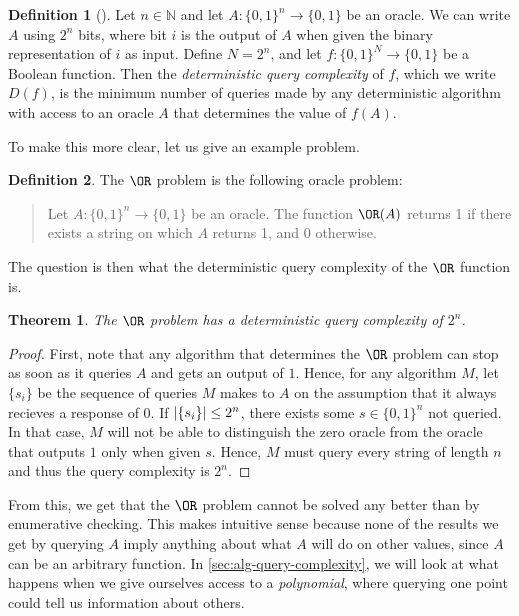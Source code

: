 \documentclass[english,12pt]{reedthesis}
\theoremstyle{plain}
\newtheorem{thm}{Theorem}[section]
\theoremstyle{definition}
\newtheorem{defn}[defn]{Definition}
\theoremstyle{remark}
\DeclarePairedDelimiter{\abs}{\lvert}{\rvert}
\begin{document}
\begin{defn}[{\cite[17]{AW09}}]\label{def:det-qc}
  Let $n \in \mathbb{N}$ and let $A\colon \{0, 1\}^{n} \rightarrow \{0, 1\}$ be an oracle. We can write
  $A$ using $2^{n}$ bits, where bit $i$ is the output of $A$ when given the
  binary representation of $i$ as input. Define $N = 2^{n}$, and let
  $f\colon \{0, 1\}^{N} \rightarrow \{0, 1\}$ be a Boolean function. Then the
  \emph{deterministic query complexity} of $f$, which we write $D(f)$, is the
  minimum number of queries made by any deterministic algorithm with access to
  an oracle $A$ that determines the value of $f(A)$.
\end{defn}

To make this more clear, let us give an example problem.

\begin{defn}\label{def:or-problem}
  The $\OR$ problem is the following oracle problem:
  \begin{quote}
    Let $A\colon \{0, 1\}^{n} \rightarrow \{0, 1\}$ be an oracle. The function $\OR(A)$
    returns 1 if there exists a string on which $A$ returns 1, and $0$
    otherwise.
  \end{quote}
\end{defn}

The question is then what the deterministic query complexity of the $\OR$
function is.

\begin{thm}
  The $\OR$ problem has a deterministic query complexity of $2^{n}$.
\end{thm}

\begin{proof}
  First, note that any algorithm that determines the $\OR$ problem can stop as
  soon as it queries $A$ and gets an output of $1$. Hence, for any algorithm
  $M$, let $\{s_{i}\}$ be the sequence of queries $M$ makes to $A$ on the
  assumption that it always recieves a response of $0$. If
  $\abs{\{s_{i}\}} \le 2^{n}$, there exists some $s \in \{0, 1\}^{n}$ not queried.
  In that case, $M$ will not be able to distinguish the zero oracle from the
  oracle that outputs $1$ only when given $s$. Hence, $M$ must query every
  string of length $n$ and thus the query complexity is $2^{n}$.
\end{proof}

From this, we get that the $\OR$ problem cannot be solved any better than by
enumerative checking. This makes intuitive sense because none of the results we
get by querying $A$ imply anything about what $A$ will do on other values, since
$A$ can be an arbitrary function. In \cref{sec:alg-query-complexity}, we will
look at what happens when we give ourselves access to a \emph{polynomial}, where
querying one point could tell us information about others.
\end{document}
